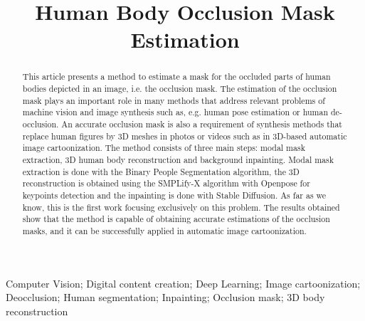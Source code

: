 \documentclass[]{interact}
\theoremstyle{plain}%
\theoremstyle{definition}
\theoremstyle{remark}
\begin{document}

\title{Human Body Occlusion Mask Estimation}

\author{
}




\maketitle

\begin{abstract}
This article presents a method to estimate a mask for the occluded parts of human bodies depicted in an image, i.e. the occlusion mask. The
estimation of the occlusion mask plays an important role in many methods
that address relevant problems of machine vision and image synthesis
such as, e.g. human pose estimation or human de-occlusion. An accurate
occlusion mask is also a requirement of synthesis methods that replace
human figures by 3D meshes in photos or videos such as in 3D-based
automatic image cartoonization. The method consists of three main steps:
modal mask extraction, 3D human body reconstruction and background
inpainting. Modal mask extraction is done with the Binary People
Segmentation algorithm, the 3D reconstruction is obtained using the
SMPLify-X algorithm with Openpose for keypoints detection and the
inpainting is done with Stable Diffusion. As far as we know, this is the
first work focusing exclusively on this problem. The results obtained
show that the method is capable of obtaining accurate estimations of the
occlusion masks, and it can be successfully applied in automatic image
cartoonization.

\end{abstract}

\begin{keywords}
Computer Vision; Digital content creation; Deep Learning; Image cartoonization; Deocclusion; Human segmentation; Inpainting; Occlusion mask; 3D body reconstruction
\end{keywords}
\end{document}
